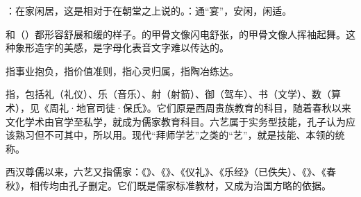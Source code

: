 {
\item {}：在家闲居，这是相对于在朝堂之上说的。：通“宴”，安闲，闲适。 %
\item {}和（）都形容舒展和缓的样子。的甲骨文像闪电舒张，的甲骨文像人挥袖起舞。这种象形造字的美感，是字母化表音文字难以传达的。%
}
{}


{
}
{} %


{
\item {}指事业抱负，指价值准则，指心灵归属，指陶冶练达。

\item {}指，包括礼（礼仪）、乐（音乐）、射（射箭）、御（驾车）、书（文学）、数（算术），见《周礼·地官司徒·保氏》。它们原是西周贵族教育的科目，随着春秋以来文化学术由官学至私学，就成为儒家教育科目。六艺属于实务型技能，孔子认为应该熟习但不可其中，所以用。现代“拜师学艺”之类的“艺”，就是技能、本领的统称。

西汉尊儒以来，六艺又指儒家：《》、《》、《仪礼》、《乐经》（已佚失）、《》、《春秋》，相传均由孔子删定。它们既是儒家标准教材，又成为治国方略的依据。
}
{}


